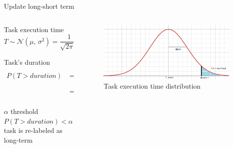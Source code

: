 \documentclass[10pt,xcolor={dvipsnames}, aspectratio=169]{beamer}
\begin{document}
\begin{frame}
{Update long-short term}
	\begin{columns}[T]
		
		\begin{column}{0.6\textwidth}
			\begin{block}
			{Task execution time} 
				\begin{equation*}
					T \sim \mathcal{N}(\mu,\,\sigma^{2}) = \frac{1}{\sqrt{2\pi}\sigma}e^{\frac{(T - \mu)^{2}}{2\sigma^{2}}}
				\end{equation*}
			\end{block}
			\begin{block}
			{Task's duration}
				\begin{align*}
					P(T > duration) &= \int_{duration}^{\infty} \frac{1}{\sqrt{2\pi}\sigma}e^{\frac{(t - \mu)^{2}}{2\sigma^{2}}} \,dt \\
									&= \frac{1}{2} - \phi(\frac{duration - \mu}{\sigma})
				\end{align*}
			\end{block}
			\begin{block}
			{$\alpha$ threshold}
			$P(T > duration) < \alpha \rightarrow$ task is re-labeled as long-term
			\end{block}	
		\end{column}
		
		\hfill
		
		\begin{column}{0.4\textwidth}
			\begin{figure}
				\centering
				\includegraphics[scale=0.18]{images/duration_prob.png}
				\caption{Task execution time distribution}
			\end{figure}
		\end{column}		
			
	\end{columns}


\end{frame}
\end{document}
